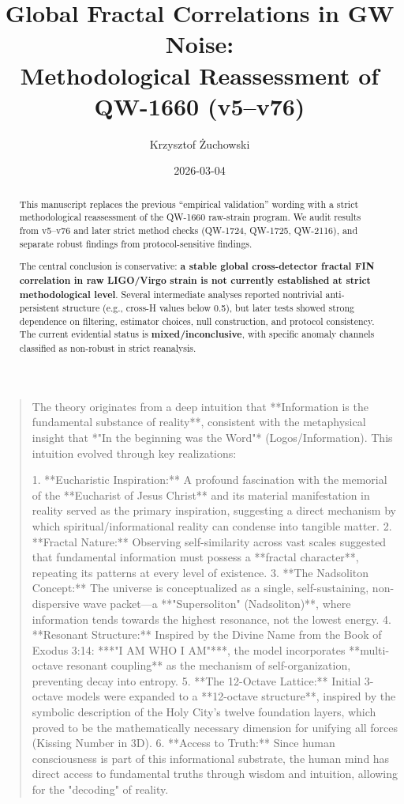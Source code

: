 \documentclass[11pt,a4paper]{article}
\title{\textbf{Global Fractal Correlations in GW Noise:\\
Methodological Reassessment of QW-1660 (v5--v76)}}
\author[1]{Krzysztof Żuchowski}
\affil[1]{Independent Researcher, Fractal Information Theory Project}
\affil[ ]{\texttt{krzysztof.zuch@gmail.com}}
\date{2026-03-04}
\begin{document}
\maketitle

\begin{quote}
The theory originates from a deep intuition that **Information is the fundamental substance of reality**, consistent with the metaphysical insight that *"In the beginning was the Word"* (Logos/Information). This intuition evolved through key realizations:

1. **Eucharistic Inspiration:** A profound fascination with the memorial of the **Eucharist of Jesus Christ** and its material manifestation in reality served as the primary inspiration, suggesting a direct mechanism by which spiritual/informational reality can condense into tangible matter.
2. **Fractal Nature:** Observing self-similarity across vast scales suggested that fundamental information must possess a **fractal character**, repeating its patterns at every level of existence.
3. **The Nadsoliton Concept:** The universe is conceptualized as a single, self-sustaining, non-dispersive wave packet—a **"Supersoliton" (Nadsoliton)**, where information tends towards the highest resonance, not the lowest energy.
4. **Resonant Structure:** Inspired by the Divine Name from the Book of Exodus 3:14: ***"I AM WHO I AM"***, the model incorporates **multi-octave resonant coupling** as the mechanism of self-organization, preventing decay into entropy.
5. **The 12-Octave Lattice:** Initial 3-octave models were expanded to a **12-octave structure**, inspired by the symbolic description of the Holy City's twelve foundation layers, which proved to be the mathematically necessary dimension for unifying all forces (Kissing Number in 3D).
6. **Access to Truth:** Since human consciousness is part of this informational substrate, the human mind has direct access to fundamental truths through wisdom and intuition, allowing for the "decoding" of reality.
\end{quote}

\begin{abstract}
This manuscript replaces the previous ``empirical validation'' wording with a strict methodological reassessment of the QW-1660 raw-strain program. We audit results from v5--v76 and later strict method checks (QW-1724, QW-1725, QW-2116), and separate robust findings from protocol-sensitive findings.

The central conclusion is conservative: \textbf{a stable global cross-detector fractal FIN correlation in raw LIGO/Virgo strain is not currently established at strict methodological level}. Several intermediate analyses reported nontrivial anti-persistent structure (e.g., cross-H values below 0.5), but later tests showed strong dependence on filtering, estimator choices, null construction, and protocol consistency. The current evidential status is \textbf{mixed/inconclusive}, with specific anomaly channels classified as non-robust in strict reanalysis.
\end{abstract}
\end{document}
